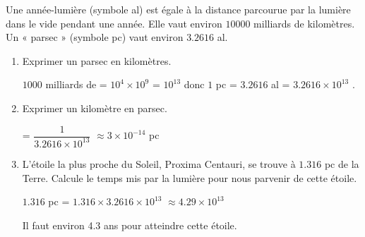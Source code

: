     Une année-lumière (symbole al) est égale à la distance parcourue par la lumière dans le vide
    pendant une année. Elle vaut environ $\num{10000}$ milliards de kilomètres. Un « parsec » (symbole pc) vaut
    environ $\num{3.2616}$ al.

    \begin{enumerate}
        \item Exprimer un parsec en kilomètres.

        {\red $\num{1000}$ milliards de \Lg[km]{} = $10^4\times 10^9$ \Lg[km]{} = $10^{13}$ \Lg[km]{}
        donc $1$ pc = $\num{3.2616}$ al = $\num{3.2616}\times 10^{13}$ \Lg[km]{}.
        }
        \item Exprimer un kilomètre en parsec.

        {\red {} = $\dfrac{1}{\num{3.2616}\times 10^{13}}$ \Lg[km]{} $\approx 3\times 10^{-14}$ pc
        }
        \item L'étoile la plus proche du Soleil, Proxima Centauri, se trouve à $\num{1.316}$ pc de la Terre. Calcule
        le temps mis par la lumière pour nous parvenir de cette étoile.

        {\red $\num{1.316}$ pc = $\num{1.316}\times \num{3.2616} \times 10^{13}$ \Lg[km]{} $\approx \num{4.29}\times 10^{13}$ \Lg[km]{}

        Il faut environ \num{4.3} ans pour atteindre cette étoile.
        }
    \end{enumerate}

